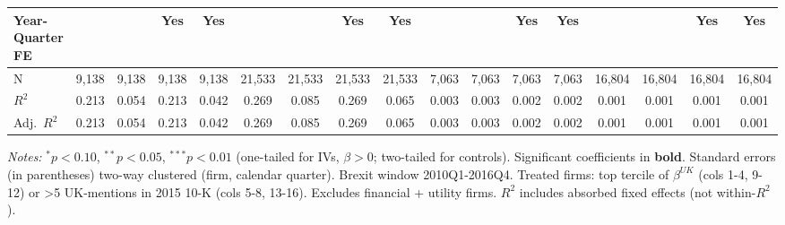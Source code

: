 \begin{landscape}
\begin{table}[H]
\begin{tabular}{lcccccccccccccccc}
Year-Quarter FE &  &  & Yes & Yes &  &  & Yes & Yes &  &  & Yes & Yes &  &  & Yes & Yes \\
\midrule
N & 9,138 & 9,138 & 9,138 & 9,138 & 21,533 & 21,533 & 21,533 & 21,533 & 7,063 & 7,063 & 7,063 & 7,063 & 16,804 & 16,804 & 16,804 & 16,804 \\
$R^2$ & 0.213 & 0.054 & 0.213 & 0.042 & 0.269 & 0.085 & 0.269 & 0.065 & 0.003 & 0.003 & 0.002 & 0.002 & 0.001 & 0.001 & 0.001 & 0.001 \\
Adj.~$R^2$ & 0.213 & 0.054 & 0.213 & 0.042 & 0.269 & 0.085 & 0.269 & 0.065 & 0.003 & 0.003 & 0.002 & 0.002 & 0.001 & 0.001 & 0.001 & 0.001 \\
\bottomrule
\end{tabular}
\begin{minipage}{\linewidth}
\vspace{2pt}\scriptsize
\textit{Notes:} $^{*}p<0.10$, $^{**}p<0.05$, $^{***}p<0.01$ (one-tailed for IVs, $\beta > 0$; two-tailed for controls).
 Significant coefficients in \textbf{bold}.
 Standard errors (in parentheses) two-way clustered (firm, calendar quarter).
 Brexit window 2010Q1-2016Q4. Treated firms: top tercile of $\beta^{UK}$ (cols 1-4, 9-12) or >5 UK-mentions in 2015 10-K (cols 5-8, 13-16). Excludes financial + utility firms.
 $R^2$ includes absorbed fixed effects (not within-$R^2$).
\end{minipage}
\end{table}
\end{landscape}